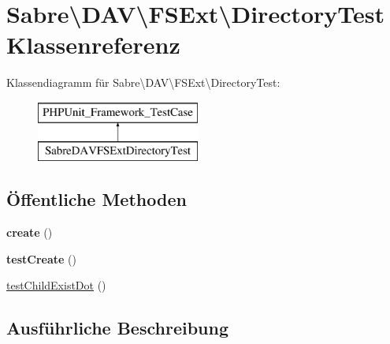 \hypertarget{class_sabre_1_1_d_a_v_1_1_f_s_ext_1_1_directory_test}{}\section{Sabre\textbackslash{}D\+AV\textbackslash{}F\+S\+Ext\textbackslash{}Directory\+Test Klassenreferenz}
\label{class_sabre_1_1_d_a_v_1_1_f_s_ext_1_1_directory_test}
Klassendiagramm für Sabre\textbackslash{}D\+AV\textbackslash{}F\+S\+Ext\textbackslash{}Directory\+Test\+:\begin{figure}[H]
\begin{center}
\leavevmode
\includegraphics[height=2.000000cm]{class_sabre_1_1_d_a_v_1_1_f_s_ext_1_1_directory_test}
\end{center}
\end{figure}
\subsection*{Öffentliche Methoden}
\begin{DoxyCompactItemize}
\item 
\mbox{\label{class_sabre_1_1_d_a_v_1_1_f_s_ext_1_1_directory_test_a5c8187336c7d8ea7f2e9d3c6b9ca9a0d}} 
{\bfseries create} ()
\item 
\mbox{\label{class_sabre_1_1_d_a_v_1_1_f_s_ext_1_1_directory_test_a884be4aaf45170543bbc046bbc7d8e95}} 
{\bfseries test\+Create} ()
\item 
\mbox{\hyperlink{class_sabre_1_1_d_a_v_1_1_f_s_ext_1_1_directory_test_a7f364bfba47fabceeb77c481395f4d47}{test\+Child\+Exist\+Dot}} ()
\end{DoxyCompactItemize}


\subsection{Ausführliche Beschreibung}



